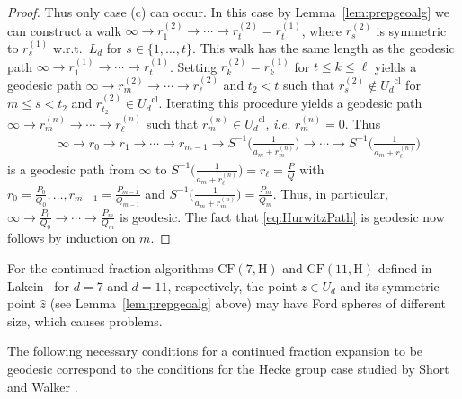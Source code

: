 \documentclass[graybox]{svmult}
\begin{document}
\begin{proof}
Thus only case (c) can occur. In this case by Lemma~\ref{lem:prepgeoalg} we can construct a walk $\infty\to r_1^{(2)}\to \cdots\to r_t^{(2)}=r_t^{(1)}$, where $r_s^{(2)}$ is symmetric to $r_s^{(1)}$ w.r.t.\ $L_d$ for $s\in \{1,\ldots, t\}$. This walk has the same length as  the geodesic path $\infty\to r_1^{(1)}\to \cdots\to r_t^{(1)}$. Setting $r_k^{(2)}=r_k^{(1)}$ for $t \le k \le \ell$ yields a geodesic path $\infty \to r_m^{(2)}\to \cdots \to r_\ell^{(2)}$ and $t_2<t$ such that $r_s^{(2)} \not\in {U_{d}}^{\mathrm{cl}}$ for $m \leq s<t_2$ and $r_{t_2}^{(2)}\in {U_{d}}^{\mathrm{cl}}$. Iterating this procedure yields a geodesic path $\infty \to r_m^{(n)} \to \cdots \to r_\ell^{(n)}$ such that  $r_{m}^{(n)}\in{U_d}^{\mathrm{cl}}$, {\em i.e.} $r_m^{(n)}=0$. Thus
\[
\begin{split}
&\infty \to r_0 \to r_1 \to \cdots \to r_{m-1} \to S^{-1}\bigg(\frac1{a_m + r_m^{(n)}}\bigg)  \to  \cdots \to S^{-1}\bigg(\frac1{a_m + r_\ell^{(n)}}\bigg)
\end{split}
\]
is a  geodesic path from $\infty$ to $S^{-1}\bigg(\frac1{a_m + r_\ell^{(n)}}\bigg)=r_\ell=\frac PQ$ with $r_0=\frac {P_0}{Q_0},\ldots, r_{m-1}=\frac {P_{m-1}}{Q_{m-1}}$ and $S^{-1}\bigg(\frac1{a_m + r_m^{(n)}}\bigg)=\frac{P_m}{Q_m}$. Thus, in particular, $\infty \to \frac{P_0}{Q_0}\to\cdots\to \frac{P_{m}}{Q_{m}}$ is geodesic. The fact that \eqref{eq:HurwitzPath} is geodesic now follows by induction on $m$.
\end{proof}

\begin{remark} 
For the continued fraction algorithms $\mathrm{CF}(7, \mathrm{H})$ and $\mathrm{CF}(11, \mathrm{H})$ defined in Lakein~\cite{lakein1973approximation} for $d=7$ and $d=11$, respectively, the point $z \in U_{d}$ and its symmetric point $\hat z$ (see Lemma~\ref{lem:prepgeoalg} above) may have Ford spheres of different size, which causes problems.
\end{remark}

The following necessary conditions for a continued fraction expansion to be geodesic correspond to the conditions for the Hecke group case studied by Short and Walker \cite{S-W}. 
\end{document}
